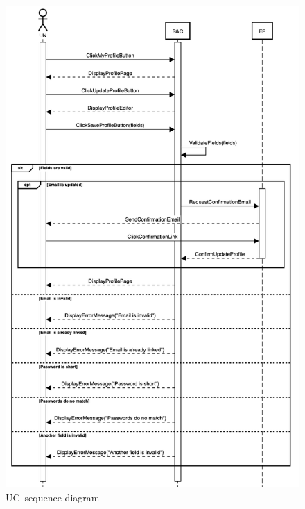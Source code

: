 \begin{figure}
    \centering
    \includegraphics[width=13cm]{images/sequence-diagrams/university-updates-profile.png}
    \caption{UC\theuc\ sequence diagram}
\end{figure}


